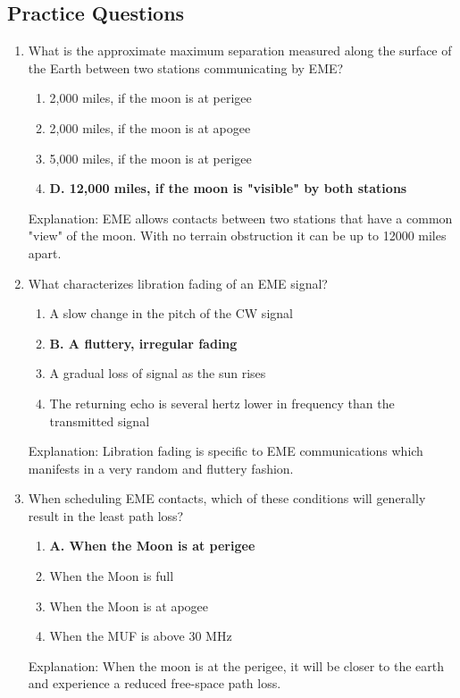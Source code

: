 \subsection*{Practice Questions}
\begin{enumerate}
      \item What is the approximate maximum separation measured along the surface of the Earth between two stations communicating by EME?
       \begin{enumerate}
        \item  2,000 miles, if the moon is at perigee
          \item  2,000 miles, if the moon is at apogee
      \item  5,000 miles, if the moon is at perigee
         \item \textbf{D. 12,000 miles, if the moon is "visible" by both stations}
        \end{enumerate}
    \textcolor{myred}{Explanation:}
   EME allows contacts between two stations that have a common "view" of the moon. With no terrain obstruction it can be up to 12000 miles apart.

    \item What characterizes libration fading of an EME signal?
      \begin{enumerate}
      \item  A slow change in the pitch of the CW signal
       \item \textbf{B. A fluttery, irregular fading}
      \item  A gradual loss of signal as the sun rises
        \item  The returning echo is several hertz lower in frequency than the transmitted signal
    \end{enumerate}
       \textcolor{myred}{Explanation:}
        Libration fading is specific to EME communications which manifests in a very random and fluttery fashion.
         
   \item When scheduling EME contacts, which of these conditions will generally result in the least path loss?
     \begin{enumerate}
      \item \textbf{A. When the Moon is at perigee}
         \item  When the Moon is full
       \item  When the Moon is at apogee
        \item  When the MUF is above 30 MHz
       \end{enumerate}
    \textcolor{myred}{Explanation:}
    When the moon is at the perigee, it will be closer to the earth and experience a reduced free-space path loss.
   

\end{enumerate}
